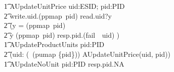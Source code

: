 \begin{circus}
        \t1 AUpdateUnitPrice \circdef uid:ESID; pid:PID \circspot \\
            \t2 write.uid.(ppmap\sym~pid) \then read.uid?y \then \\
            \t2 (\lcircguard y = (ppmap~pid) \rcircguard \circguard \Skip \\
            \t2 \extchoice \lcircguard y \neq (ppmap~pid) \rcircguard \circguard resp.pid.(fail~\sym~uid) \then \Skip) \\
        \t1 AUpdateProductUnits \circdef pid:PID \circspot \\
            \t2 (\Interleave uid: (\dom~(pumap \rres \{pid\}))  \circspot AUpdateUnitPrice(uid, pid)) \\
        \t1 AUpdateNoUnit \circdef  pid:PID \circspot resp.pid.NA \then \Skip \\
%

\end{circus}
